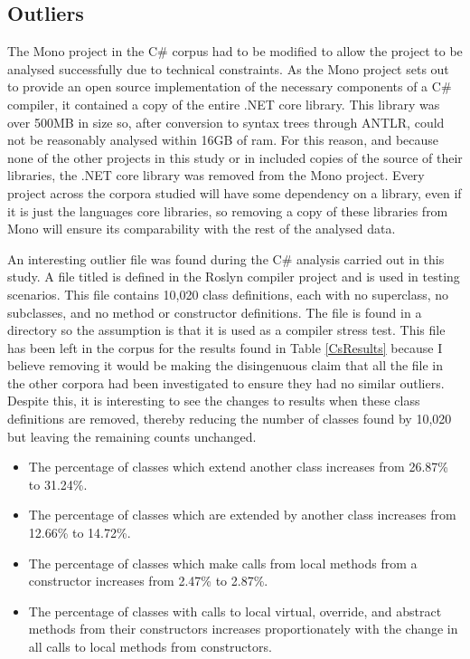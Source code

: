 \subsection{Outliers}
The Mono project in the C\# corpus had to be modified to allow the project to be analysed successfully due to technical constraints. As the Mono project sets out to provide an open source implementation of the necessary components of a C\# compiler, it contained a copy of the entire .NET core library. This library was over 500MB in size so, after conversion to syntax trees through ANTLR, could not be reasonably analysed within 16GB of ram. For this reason, and because none of the other projects in this study or in \cite{QualitasCorpus} included copies of the source of their libraries, the .NET core library was removed from the Mono project. Every project across the corpora studied will have some dependency on a library, even if it is just the languages core libraries, so removing a copy of these libraries from Mono will ensure its comparability with the rest of the analysed data.
\newline

An interesting outlier file was found during the C\# analysis carried out in this study. A file titled  is defined in the Roslyn compiler project and is used in testing scenarios. This file contains 10,020 class definitions, each with no superclass, no subclasses, and no method or constructor definitions. The file is found in a  directory so the assumption is that it is used as a compiler stress test. This file has been left in the corpus for the results found in Table \ref{CsResults} because I believe removing it would be making the disingenuous claim that all the file in the other corpora had been investigated to ensure they had no similar outliers. Despite this, it is interesting to see the changes to results when these class definitions are removed, thereby reducing the number of classes found by 10,020 but leaving the remaining counts unchanged.
\begin{itemize}
	\item The percentage of classes which extend another class increases from 26.87\% to 31.24\%.
	\item The percentage of classes which are extended by another class increases from 12.66\% to 14.72\%.
	\item The percentage of classes which make calls from local methods from a constructor increases from 2.47\% to 2.87\%.
	\item The percentage of classes with calls to local virtual, override, and abstract methods from their constructors increases proportionately with the change in all calls to local methods from constructors.
\end{itemize}

